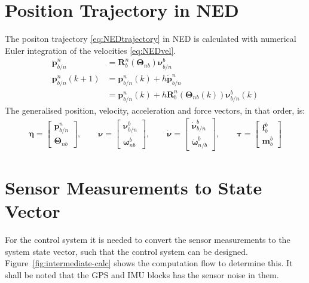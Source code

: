 \section{Position Trajectory in \acs{NED}}
The positon trajectory \vref{eq:NEDtrajectory} in \ac{NED} is calculated with numerical Euler integration of the velocities \vref{eq:NEDvel}.
\begin{subequations}
\begin{align}
\dot{\mathbf{p}}^n _{b/n} &= \mathbf{R}^n _b (\boldsymbol{\Theta}_{nb}) \boldsymbol{\nu}^b _{b/n} \label{eq:NEDvel}\\
\mathbf{p}^n _{b/n}(k+1) &= \mathbf{p}^n _{b/n}(k) + h \dot{\mathbf{p}}^n _{b/n} \label{eq:NEDtrajectory} \\
&= \mathbf{p}^n _{b/n}(k) + h \mathbf{R}^n _b (\boldsymbol{\Theta}_{nb}(k)) \boldsymbol{\nu}^b _{b/n}(k) 
\end{align}
\end{subequations}
The generalised position, velocity, acceleration and force vectors, in that order, is:
\begin{align}
\boldsymbol{\eta} =
\begin{bmatrix}
\mathbf{p}^n _{b/n}\\\boldsymbol{\Theta}_{nb}
\end{bmatrix},\qquad
\boldsymbol{\nu} =
\begin{bmatrix}
\boldsymbol{\nu}^b _{b/n}\\\boldsymbol{\omega}^b _{nb}
\end{bmatrix},\qquad
\dot{\boldsymbol{\nu}} =
\begin{bmatrix}
\dot{\boldsymbol{\nu}}^b _{b/n}\\\dot{\boldsymbol{\omega}}^b _{n/b}
\end{bmatrix},\qquad
\boldsymbol{\tau} =
\begin{bmatrix}
\mathbf{f}^b _b\\\mathbf{m}^b _b
\end{bmatrix}
\end{align}

\section{Sensor Measurements to State Vector}
For the control system it is needed to convert the sensor measurements
to the system state vector, such that the control system can be
designed. Figure~\vref{fig:intermediate-calc} shows the computation
flow to determine this. It shall be noted that the \ac{GPS} and
\ac{IMU} blocks has the sensor noise in them.

